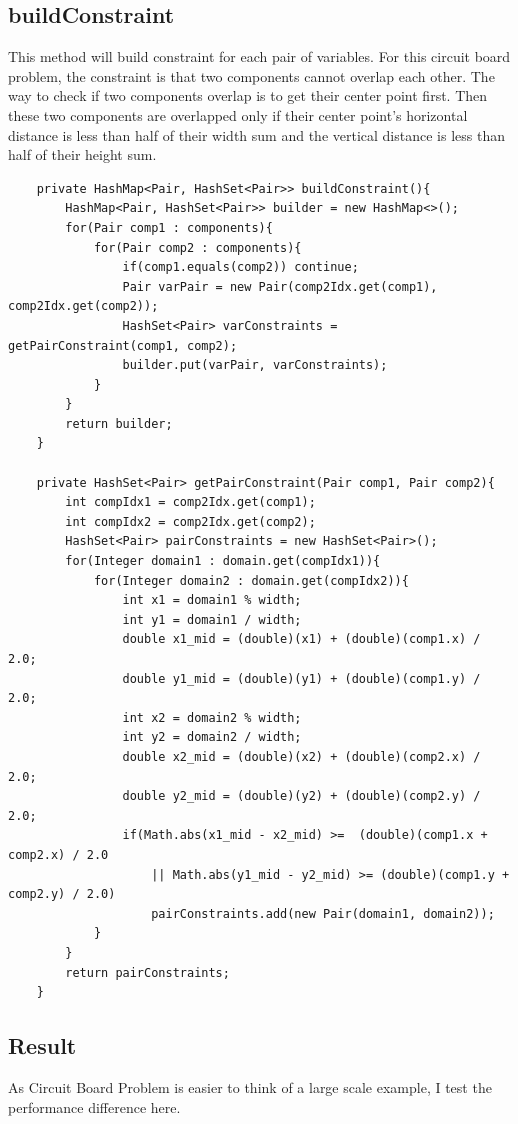\documentclass{article}
\begin{document}
\subsection{buildConstraint}
This method will build constraint for each pair of variables. For this circuit board problem, the constraint is that two components cannot overlap each other. The way to check if two components overlap is to get their center point first. Then these two components are overlapped only if their center point's horizontal distance is less than half of their width sum and the vertical distance is less than half of their height sum.
\begin{lstlisting}
	private HashMap<Pair, HashSet<Pair>> buildConstraint(){
		HashMap<Pair, HashSet<Pair>> builder = new HashMap<>();
		for(Pair comp1 : components){
			for(Pair comp2 : components){
				if(comp1.equals(comp2)) continue;
				Pair varPair = new Pair(comp2Idx.get(comp1), comp2Idx.get(comp2));
				HashSet<Pair> varConstraints = getPairConstraint(comp1, comp2);
				builder.put(varPair, varConstraints);
			}
		}
		return builder;
	}
	
	private HashSet<Pair> getPairConstraint(Pair comp1, Pair comp2){
		int compIdx1 = comp2Idx.get(comp1);
		int compIdx2 = comp2Idx.get(comp2);
		HashSet<Pair> pairConstraints = new HashSet<Pair>();
		for(Integer domain1 : domain.get(compIdx1)){
			for(Integer domain2 : domain.get(compIdx2)){
				int x1 = domain1 % width;
				int y1 = domain1 / width;
				double x1_mid = (double)(x1) + (double)(comp1.x) / 2.0;
				double y1_mid = (double)(y1) + (double)(comp1.y) / 2.0;
				int x2 = domain2 % width;
				int y2 = domain2 / width;
				double x2_mid = (double)(x2) + (double)(comp2.x) / 2.0;
				double y2_mid = (double)(y2) + (double)(comp2.y) / 2.0;
				if(Math.abs(x1_mid - x2_mid) >=  (double)(comp1.x + comp2.x) / 2.0 
					|| Math.abs(y1_mid - y2_mid) >= (double)(comp1.y + comp2.y) / 2.0)
					pairConstraints.add(new Pair(domain1, domain2));
			}
		}
		return pairConstraints;
	}
\end{lstlisting}

\subsection{Result}
As Circuit Board Problem is easier to think of a large scale example, I test the performance difference here.
\end{document}
